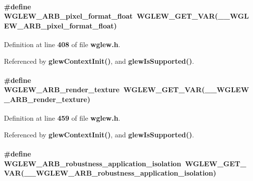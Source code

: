 \paragraph[{W\+G\+L\+E\+W\+\_\+\+A\+R\+B\+\_\+pixel\+\_\+format\+\_\+float}]{\setlength{\rightskip}{0pt plus 5cm}\#define W\+G\+L\+E\+W\+\_\+\+A\+R\+B\+\_\+pixel\+\_\+format\+\_\+float~{\bf W\+G\+L\+E\+W\+\_\+\+G\+E\+T\+\_\+\+V\+AR}({\bf \+\_\+\+\_\+\+W\+G\+L\+E\+W\+\_\+\+A\+R\+B\+\_\+pixel\+\_\+format\+\_\+float})}\label{wglew_8h_abf9a1950be977e2961b127fac307e3cb}


Definition at line {\bf 408} of file {\bf wglew.\+h}.



Referenced by {\bf glew\+Context\+Init()}, and {\bf glew\+Is\+Supported()}.

\paragraph[{W\+G\+L\+E\+W\+\_\+\+A\+R\+B\+\_\+render\+\_\+texture}]{\setlength{\rightskip}{0pt plus 5cm}\#define W\+G\+L\+E\+W\+\_\+\+A\+R\+B\+\_\+render\+\_\+texture~{\bf W\+G\+L\+E\+W\+\_\+\+G\+E\+T\+\_\+\+V\+AR}({\bf \+\_\+\+\_\+\+W\+G\+L\+E\+W\+\_\+\+A\+R\+B\+\_\+render\+\_\+texture})}\label{wglew_8h_ababa882bfb0b7f4822ab4269ac5f5fd6}


Definition at line {\bf 459} of file {\bf wglew.\+h}.



Referenced by {\bf glew\+Context\+Init()}, and {\bf glew\+Is\+Supported()}.

\paragraph[{W\+G\+L\+E\+W\+\_\+\+A\+R\+B\+\_\+robustness\+\_\+application\+\_\+isolation}]{\setlength{\rightskip}{0pt plus 5cm}\#define W\+G\+L\+E\+W\+\_\+\+A\+R\+B\+\_\+robustness\+\_\+application\+\_\+isolation~{\bf W\+G\+L\+E\+W\+\_\+\+G\+E\+T\+\_\+\+V\+AR}({\bf \+\_\+\+\_\+\+W\+G\+L\+E\+W\+\_\+\+A\+R\+B\+\_\+robustness\+\_\+application\+\_\+isolation})}\label{wglew_8h_af08f3574f9d022e8fadfff2b763d68fd}


